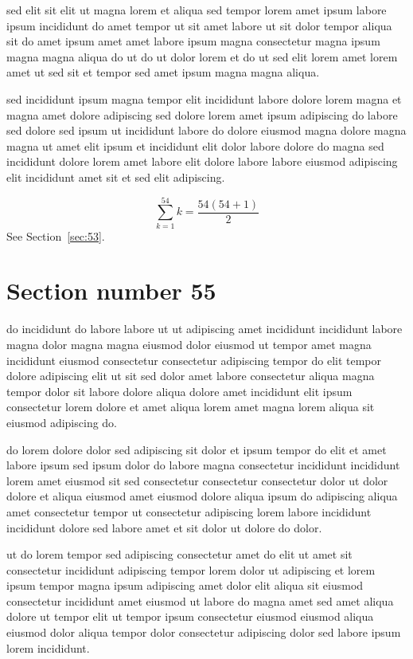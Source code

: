 \documentclass{article}
\begin{document}
sed elit sit elit ut magna lorem et aliqua sed tempor lorem amet ipsum labore ipsum incididunt do amet tempor ut sit amet labore ut sit dolor tempor aliqua sit do amet ipsum amet amet labore ipsum magna consectetur magna ipsum magna magna aliqua do ut do ut dolor lorem et do ut sed elit lorem amet lorem amet ut sed sit et tempor sed amet ipsum magna magna aliqua.

sed incididunt ipsum magna tempor elit incididunt labore dolore lorem magna et magna amet dolore adipiscing sed dolore lorem amet ipsum adipiscing do labore sed dolore sed ipsum ut incididunt labore do dolore eiusmod magna dolore magna magna ut amet elit ipsum et incididunt elit dolor labore dolore do magna sed incididunt dolore lorem amet labore elit dolore labore labore eiusmod adipiscing elit incididunt amet sit et sed elit adipiscing.

\begin{equation} \sum_{k=1}^{54} k = \frac{54(54+1)}{2} \end{equation}
See Section~\ref{sec:53}.

\section{Section number 55}\label{sec:55}
do incididunt do labore labore ut ut adipiscing amet incididunt incididunt labore magna dolor magna magna eiusmod dolor eiusmod ut tempor amet magna incididunt eiusmod consectetur consectetur adipiscing tempor do elit tempor dolore adipiscing elit ut sit sed dolor amet labore consectetur aliqua magna tempor dolor sit labore dolore aliqua dolore amet incididunt elit ipsum consectetur lorem dolore et amet aliqua lorem amet magna lorem aliqua sit eiusmod adipiscing do.

do lorem dolore dolor sed adipiscing sit dolor et ipsum tempor do elit et amet labore ipsum sed ipsum dolor do labore magna consectetur incididunt incididunt lorem amet eiusmod sit sed consectetur consectetur consectetur dolor ut dolor dolore et aliqua eiusmod amet eiusmod dolore aliqua ipsum do adipiscing aliqua amet consectetur tempor ut consectetur adipiscing lorem labore incididunt incididunt dolore sed labore amet et sit dolor ut dolore do dolor.

ut do lorem tempor sed adipiscing consectetur amet do elit ut amet sit consectetur incididunt adipiscing tempor lorem dolor ut adipiscing et lorem ipsum tempor magna ipsum adipiscing amet dolor elit aliqua sit eiusmod consectetur incididunt amet eiusmod ut labore do magna amet sed amet aliqua dolore ut tempor elit ut tempor ipsum consectetur eiusmod eiusmod aliqua eiusmod dolor aliqua tempor dolor consectetur adipiscing dolor sed labore ipsum lorem incididunt.
\end{document}
